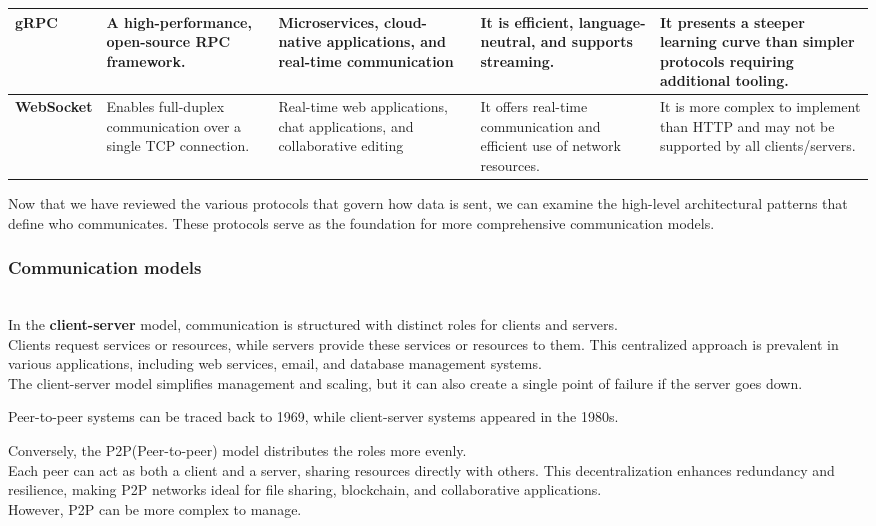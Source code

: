 \begin{center}
\begin{tabular}{|l|p{3.5cm}|p{3.5cm}|p{3.5cm}|p{3.5cm}|}
\hline
\textbf{gRPC} & A high-performance, open-source RPC framework. & Microservices, cloud-native applications, and real-time communication & It is efficient, language-neutral, and supports streaming. & It presents a steeper learning curve than simpler protocols requiring additional tooling. \\
\hline
\textbf{WebSocket} & Enables full-duplex communication over a single TCP connection. & Real-time web applications, chat applications, and collaborative editing & It offers real-time communication and efficient use of network resources. & It is more complex to implement than HTTP and may not be supported by all clients/servers. \\
\hline
\end{tabular}
\end{center}


Now that we have reviewed the various protocols that govern how data is sent, we can examine the high-level architectural patterns that define who communicates. These protocols serve as the foundation for more comprehensive communication models.

\subsubsection{Communication models}\label{5ubhEdmF9HqQn_tf2klCp}
\\
In the \textbf{client-server} model, communication is structured with distinct roles for clients and servers.
\\
Clients request services or resources, while servers provide these services or resources to them. This centralized approach is prevalent in various applications, including web services, email, and database management systems.
\\
The client-server model simplifies management and scaling, but it can also create a single point of failure if the server goes down.

Peer-to-peer systems can be traced back to 1969, while client-server systems appeared in the 1980s.

Conversely, the P2P(Peer-to-peer) model distributes the roles more evenly.
\\
Each peer can act as both a client and a server, sharing resources directly with others. This decentralization enhances redundancy and resilience, making P2P networks ideal for file sharing, blockchain, and collaborative applications.
\\
However, P2P can be more complex to manage.


